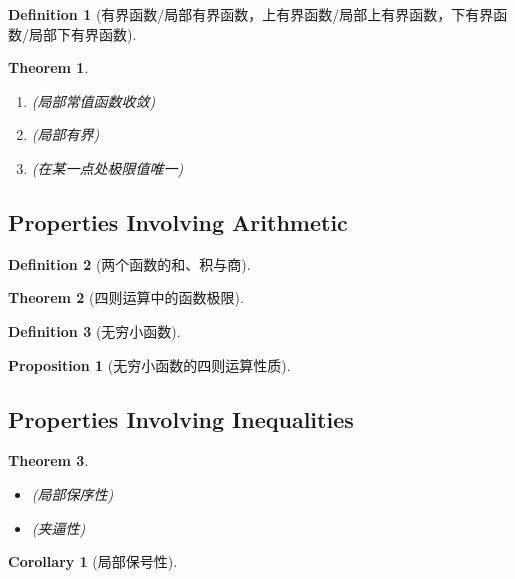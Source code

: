 \documentclass[onecolumn]{ctexart}
\newtheorem{definition}{Definition}
\newtheorem{theorem}{Theorem}
\newtheorem{proposition}{Proposition}
\newtheorem{corollary}{Corollary}
\begin{document}
\begin{definition}[有界函数/局部有界函数，上有界函数/局部上有界函数，下有界函数/局部下有界函数]
  
\end{definition}

\begin{theorem}
  \begin{enumerate}
    \item (局部常值函数收敛)
    \item (局部有界)
    \item (在某一点处极限值唯一)
  \end{enumerate}
\end{theorem}

\subsection{Properties Involving Arithmetic}

\begin{definition}[两个函数的和、积与商]
  
\end{definition}

\begin{theorem}[四则运算中的函数极限]
  
\end{theorem}

\begin{definition}[无穷小函数]
  
\end{definition}

\begin{proposition}[无穷小函数的四则运算性质]
  
\end{proposition}

\subsection{Properties Involving Inequalities}

\begin{theorem}
  \begin{itemize}
    \item (局部保序性)
    \item (夹逼性)
  \end{itemize}
\end{theorem}

\begin{corollary}[局部保号性]
  
\end{corollary}
\end{document}
